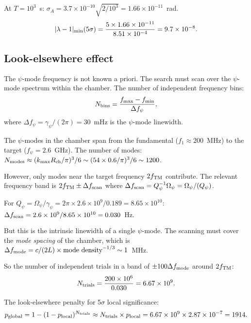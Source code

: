 \documentclass[11pt]{article}
\newcommand{\ee}[1]{\times 10^{#1}}
\newcommand{\Opsi}{\Omega_\psi}
\newcommand{\gpsi}{\gamma_\psi}
\newcommand{\lam}{\lambda}
\begin{document}
At $T = 10^3$~s:
$\sigma_A = 3.7\ee{-10}\sqrt{2/10^3} = 1.66\ee{-11}$~rad.
\begin{equation}
|\lam-1|_{\rm min}(5\sigma) = \frac{5 \times 1.66\ee{-11}}{8.51\ee{-4}}
= 9.7\ee{-8}.
\end{equation}

\subsection{Look-elsewhere effect}

The $\psi$-mode frequency is not known a priori. The search must
scan over the $\psi$-mode spectrum within the chamber. The number
of independent frequency bins:
\begin{equation}
N_{\rm bins} = \frac{f_{\rm max} - f_{\rm min}}{\Delta f_\psi},
\end{equation}
where $\Delta f_\psi = \gpsi/(2\pi) = 30$~mHz is the $\psi$-mode
linewidth.

The $\psi$-modes in the chamber span from the fundamental
($f_1 \approx 200$~MHz) to the target ($f_\psi = 2.6$~GHz).
The number of modes: $N_{\rm modes} \approx (k_{\rm max}
R_{\rm ch}/\pi)^3/6 \sim (54\times0.6/\pi)^3/6 \sim 1200$.

However, only modes near the target frequency $2f_{\rm TM}$ contribute.
The relevant frequency band is $2f_{\rm TM} \pm \Delta f_{\rm scan}$
where $\Delta f_{\rm scan} = Q_\psi^{-1}\Opsi = \Opsi/(Q_\psi)$.

For $Q_\psi = \Opsi/\gpsi = 2\pi\times2.6\ee{9}/0.189
= 8.65\ee{10}$: $\Delta f_{\rm scan} = 2.6\ee{9}/8.65\ee{10}
= 0.030$~Hz.

But this is the intrinsic linewidth of a single $\psi$-mode. The
scanning must cover the \emph{mode spacing} of the chamber, which
is $\Delta f_{\rm mode} = c/(2L) \times \text{mode density}^{-1/3}
\sim 1$~MHz.

So the number of independent trials in a band of $\pm 100\Delta f_{\rm mode}$
around $2f_{\rm TM}$:
\begin{equation}
N_{\rm trials} = \frac{200\ee{6}}{0.030} = 6.67\ee{9}.
\end{equation}

The look-elsewhere penalty for 5$\sigma$ local significance:
\begin{equation}
p_{\rm global} = 1 - (1 - p_{\rm local})^{N_{\rm trials}}
\approx N_{\rm trials} \times p_{\rm local}
= 6.67\ee{9} \times 2.87\ee{-7} = 1914.
\end{equation}
\end{document}
